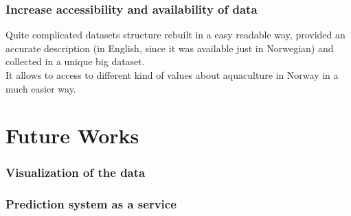 \section{Increase accessibility and availability of data}
Quite complicated datasets structure rebuilt in a easy readable way, provided an accurate description (in English, since it was available just in Norwegian) and collected in a unique big dataset. \\
It allows to access to different kind of values about aquaculture in Norway in a much easier way.



\part{Future Works}
\section{Visualization of the data}
\section{Prediction system as a service}









